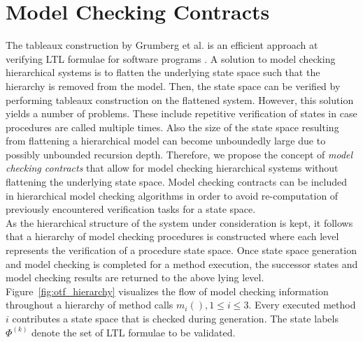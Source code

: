 \documentclass[a4paper, 12pt, twoside]{report}
\begin{document}
	\section{Model Checking Contracts}
	
	The tableaux construction by Grumberg et al. is an efficient approach at verifying LTL formulae for software programs  \cite{bhat1995efficient}. A solution to model checking hierarchical systems is to flatten the underlying state space such that the hierarchy is removed from the model. Then, the state space can be verified by performing tableaux construction on the flattened system. However, this solution yields a number of problems. These include repetitive verification of states in case procedures are called multiple times. Also the size of the state space resulting from flattening a hierarchical model can become unboundedly large due to possibly unbounded recursion depth. Therefore, we propose the concept of \textit{model checking contracts}  that allow for model checking hierarchical systems without flattening the underlying state space. Model checking contracts can be included in hierarchical model checking algorithms in order to avoid re-computation of previously encountered verification tasks for a state space.\\
		
	As the hierarchical structure of the system under consideration is kept, it follows that a hierarchy of model checking procedures is constructed where each level represents the verification of a procedure state space. Once state space generation and model checking is completed for a method execution, the successor states and model checking results are returned to the above lying level. Figure~\ref{fig:otf_hierarchy} visualizes the flow of model checking information throughout a hierarchy of method calls $m_i(), 1 \leq i \leq 3$. Every executed method $i$ contributes a state space that is checked during generation. The state labels $\Phi^{(k)}$ denote the set of LTL formulae to be validated.\\	
\end{document}
